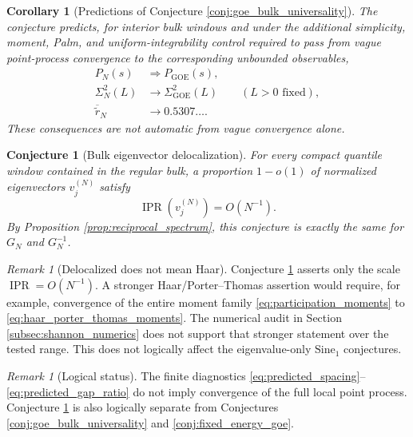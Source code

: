 \documentclass[11pt]{amsart}
\numberwithin{equation}{section}
\theoremstyle{plain}
\newtheorem{corollary}[theorem]{Corollary}
\newtheorem{conjecture}[theorem]{Conjecture}
\theoremstyle{definition}
\theoremstyle{remark}
\newtheorem{remark}[theorem]{Remark}
\newcommand{\IPR}{\operatorname{IPR}}
\newcommand{\GOE}{\mathrm{GOE}}
\begin{document}
\begin{corollary}[Predictions of Conjecture \ref{conj:goe_bulk_universality}]
\label{cor:goe_predictions}
The conjecture predicts, for interior bulk windows and under the additional simplicity, moment, Palm, and uniform-integrability control required to pass from vague point-process convergence to the corresponding unbounded observables,
\begin{align}
P_N(s)&\Longrightarrow P_{\GOE}(s),
\label{eq:predicted_spacing}\\
\Sigma_N^2(L)&\longrightarrow\Sigma_{\GOE}^2(L)
\qquad(L>0\text{ fixed}),
\label{eq:predicted_number_variance}\\
\overline{\widetilde r}_N&\longrightarrow0.5307\ldots.
\label{eq:predicted_gap_ratio}
\end{align}
These consequences are not automatic from vague convergence alone.
\end{corollary}

\begin{conjecture}[Bulk eigenvector delocalization]
\label{conj:bulk_delocalization}
For every compact quantile window contained in the regular bulk, a proportion $1-o(1)$ of normalized eigenvectors $v_j^{(N)}$ satisfy
\begin{equation}
\IPR\!\left(v_j^{(N)}\right)=O(N^{-1}).
\label{eq:ipr_conjecture}
\end{equation}
By Proposition \ref{prop:reciprocal_spectrum}, this conjecture is exactly the same for $G_N$ and $G_N^{-1}$.
\end{conjecture}


\begin{remark}[Delocalized does not mean Haar]
\label{rem:delocalized_not_haar}
Conjecture \ref{conj:bulk_delocalization} asserts only the scale $\IPR=O(N^{-1})$.  A stronger Haar/Porter--Thomas assertion would require, for example, convergence of the entire moment family \eqref{eq:participation_moments} to \eqref{eq:haar_porter_thomas_moments}.  The numerical audit in Section \ref{subsec:shannon_numerics} does not support that stronger statement over the tested range.  This does not logically affect the eigenvalue-only $\mathrm{Sine}_1$ conjectures.
\end{remark}

\begin{remark}[Logical status]
\label{rem:not_equivalent_diagnostics}
The finite diagnostics \eqref{eq:predicted_spacing}--\eqref{eq:predicted_gap_ratio} do not imply convergence of the full local point process.  Conjecture \ref{conj:bulk_delocalization} is also logically separate from Conjectures \ref{conj:goe_bulk_universality} and \ref{conj:fixed_energy_goe}.
\end{remark}
\end{document}
